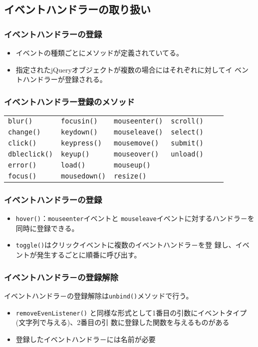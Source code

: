 \documentclass[dvipsk]{beamer}
\begin{document}
\subsection{イベントハンドラーの取り扱い}
\begin{frame}[containsverbatim]
\frametitle{イベントハンドラーの登録}
\begin{itemize}
 \item イベントの種類ごとにメソッドが定義されていてる。
 \item 指定されたjQueryオブジェクトが複数の場合にはそれぞれに対してイ
ベントハンドラーが登録される。
\end{itemize}
\end{frame}
\begin{frame}[containsverbatim]
\frametitle{イベントハンドラー登録のメソッド}
 \begin{tabular}{llllll}
\texttt{blur()}& \texttt{focusin()}&\texttt{mouseenter()} &\texttt{scroll()}\\
\texttt{change()}&\texttt{keydown()}&\texttt{mouseleave()} &\texttt{select()} \\
  \texttt{click()}& \texttt{keypress()} &\texttt{mousemove()} &\texttt{submit()} \\
\texttt{dbleclick()}& \texttt{keyup()} &\texttt{mouseover()}& \texttt{unload()} \\
\texttt{error()}&\texttt{load()} &\texttt{mouseup()} &\\
 \texttt{focus()}&\texttt{mousedown()}&\texttt{resize()}&\\
 \end{tabular}
\end{frame}
\begin{frame}[containsverbatim]
\frametitle{イベントハンドラーの登録}
\begin{itemize}
 \item \texttt{hover()}：\texttt{mouseenter}イベントと
       \texttt{mouseleave}イベントに対するハンドラ－を同時に登録できる。
 \item \texttt{toggle()}はクリックイベントに複数のイベントハンドラ－を登
       録し、イベントが発生するごとに順番に呼び出す。
\end{itemize}
\end{frame}
\begin{frame}[containsverbatim]
 \frametitle{イベントハンドラ－の登録解除}
 イベントハンドラ－の登録解除は\texttt{unbind()}メソッドで行う。
 \begin{itemize}
  \item \texttt{removeEvenListener()}
と同様な形式として1番目の引数にイベントタイプ(文字列で与える)、2番目の引
数に登録した関数を与えるものがある
  \item 登録したイベントハンドラ－には名前が必要
 \end{itemize}
\end{frame}
\end{document}
